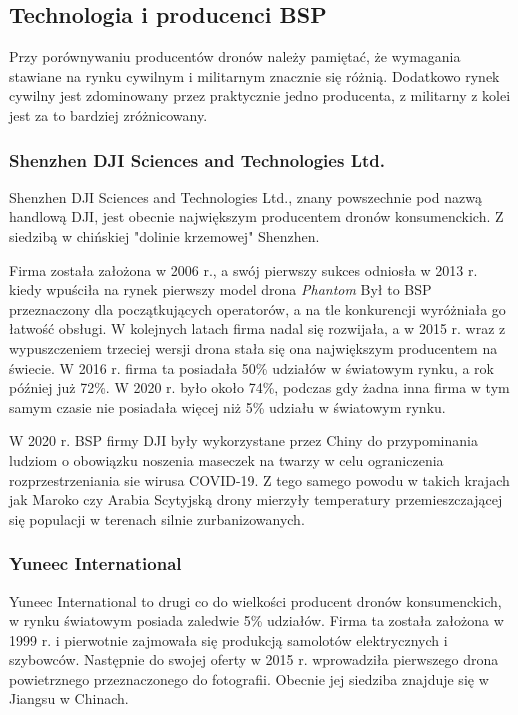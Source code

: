 \subsection{Technologia i producenci BSP}
\hspace{1cm}Przy porównywaniu producentów dronów należy pamiętać, że wymagania stawiane na rynku cywilnym i militarnym znacznie się różnią. Dodatkowo rynek cywilny jest zdominowany przez praktycznie jedno producenta, z militarny z kolei jest za to bardziej zróżnicowany.

\subsubsection{Shenzhen DJI Sciences and Technologies Ltd.}
\hspace{1cm}Shenzhen DJI Sciences and Technologies Ltd., znany powszechnie pod nazwą handlową DJI, jest obecnie największym producentem dronów konsumenckich. Z siedzibą w chińskiej "dolinie krzemowej" Shenzhen.

Firma została założona w 2006 r., a swój pierwszy sukces odniosła w 2013 r. kiedy wpuściła na rynek pierwszy model drona \textit{Phantom} Był to BSP przeznaczony dla początkujących operatorów, a na tle konkurencji wyróżniała go łatwość obsługi. W kolejnych latach firma nadal się rozwijała, a w 2015 r. wraz z wypuszczeniem trzeciej wersji drona stała się ona największym producentem na świecie. W 2016 r. firma ta posiadała 50\% udziałów w światowym rynku, a rok później już 72\%. W 2020 r. było około 74\%, podczas gdy żadna inna firma w tym samym czasie nie posiadała więcej niż 5\% udziału w światowym rynku.

W 2020 r. BSP firmy DJI były wykorzystane przez Chiny do przypominania ludziom o obowiązku noszenia maseczek na twarzy w celu ograniczenia rozprzestrzeniania sie wirusa COVID-19. Z tego samego powodu w takich krajach jak Maroko czy Arabia Scytyjską drony mierzyły temperatury przemieszczającej się populacji w terenach silnie zurbanizowanych.\cite{dji-wiki}\cite{dji-market-share}

\subsubsection{Yuneec International}

\hspace{1cm}Yuneec International to drugi co do wielkości producent dronów konsumenckich, w rynku światowym posiada zaledwie 5\% udziałów. Firma ta została założona w 1999 r. i pierwotnie zajmowała się produkcją samolotów elektrycznych i szybowców. Następnie do swojej oferty w 2015 r. wprowadziła pierwszego drona powietrznego przeznaczonego do fotografii. Obecnie jej siedziba znajduje się w Jiangsu w Chinach.


